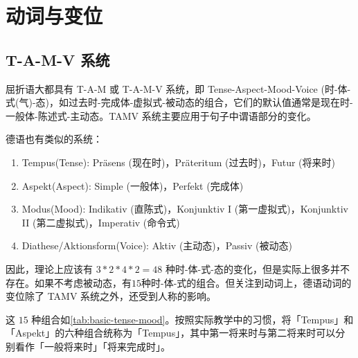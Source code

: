 \section{动词与变位}

\subsection{T-A-M-V 系统}

屈折语大都具有 T-A-M 或 T-A-M-V 系统，即 Tense-Aspect-Mood-Voice (时-体-式(气)-态)，如过去时-完成体-虚拟式-被动态的组合，它们的默认值通常是现在时-一般体-陈述式-主动态。TAMV 系统主要应用于句子中谓语部分的变化。

德语也有类似的系统：
\begin{enumerate}[leftmargin=3.5em, topsep=0pt, itemsep=0pt, parsep=0pt]
    \item Tempus(Tense): Präsens (现在时)，Präteritum (过去时)，Futur (将来时)
    \item Aspekt(Aspect): Simple (一般体)，Perfekt (完成体)
    \item Modus(Mood): Indikativ (直陈式)，Konjunktiv I (第一虚拟式)，Konjunktiv II (第二虚拟式)，Imperativ (命令式)
    \item Diathese/Aktionsform(Voice): Aktiv (主动态)，Passiv (被动态)
\end{enumerate}

因此，理论上应该有 $3*2*4*2=48$ 种时-体-式-态的变化，但是实际上很多并不存在。如果不考虑被动态，有$15$种时-体-式的组合。但关注到动词上，德语动词的变位除了 TAMV 系统之外，还受到人称的影响。

这 $15$ 种组合如\cref{tab:basic-tense-mood}。按照实际教学中的习惯，将「Tempus」和「Aspekt」的六种组合统称为「Tempus」，其中第一将来时与第二将来时可以分别看作「一般将来时」「将来完成时」。

